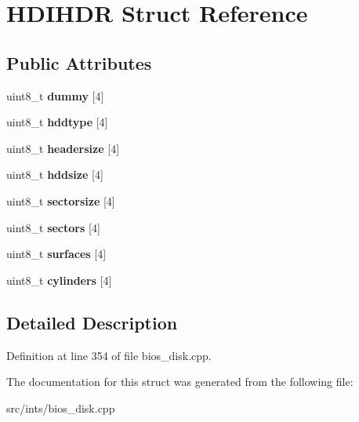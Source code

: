 \hypertarget{structHDIHDR}{\section{H\-D\-I\-H\-D\-R Struct Reference}
\label{structHDIHDR}
}
\subsection*{Public Attributes}
\begin{DoxyCompactItemize}
\item 
\hypertarget{structHDIHDR_ae41c262463f3201e383a1c9390ae901c}{uint8\-\_\-t {\bfseries dummy} \mbox{[}4\mbox{]}}\label{structHDIHDR_ae41c262463f3201e383a1c9390ae901c}

\item 
\hypertarget{structHDIHDR_ab51b532bb68c10726d57f635bb77dc4d}{uint8\-\_\-t {\bfseries hddtype} \mbox{[}4\mbox{]}}\label{structHDIHDR_ab51b532bb68c10726d57f635bb77dc4d}

\item 
\hypertarget{structHDIHDR_ab03e0699debea645f1ba0571ddedf82a}{uint8\-\_\-t {\bfseries headersize} \mbox{[}4\mbox{]}}\label{structHDIHDR_ab03e0699debea645f1ba0571ddedf82a}

\item 
\hypertarget{structHDIHDR_a552e396437dfc751af75133fc9abd875}{uint8\-\_\-t {\bfseries hddsize} \mbox{[}4\mbox{]}}\label{structHDIHDR_a552e396437dfc751af75133fc9abd875}

\item 
\hypertarget{structHDIHDR_a2dc5f3e10810fa24566f03f8b26dab4f}{uint8\-\_\-t {\bfseries sectorsize} \mbox{[}4\mbox{]}}\label{structHDIHDR_a2dc5f3e10810fa24566f03f8b26dab4f}

\item 
\hypertarget{structHDIHDR_aa8388e85e4ef3007467293eea28e0082}{uint8\-\_\-t {\bfseries sectors} \mbox{[}4\mbox{]}}\label{structHDIHDR_aa8388e85e4ef3007467293eea28e0082}

\item 
\hypertarget{structHDIHDR_a74ee482205337db4273020bef91f3056}{uint8\-\_\-t {\bfseries surfaces} \mbox{[}4\mbox{]}}\label{structHDIHDR_a74ee482205337db4273020bef91f3056}

\item 
\hypertarget{structHDIHDR_a61459f45085bcacd0325cc64862fc396}{uint8\-\_\-t {\bfseries cylinders} \mbox{[}4\mbox{]}}\label{structHDIHDR_a61459f45085bcacd0325cc64862fc396}

\end{DoxyCompactItemize}


\subsection{Detailed Description}


Definition at line 354 of file bios\-\_\-disk.\-cpp.



The documentation for this struct was generated from the following file\-:\begin{DoxyCompactItemize}
\item 
src/ints/bios\-\_\-disk.\-cpp\end{DoxyCompactItemize}
